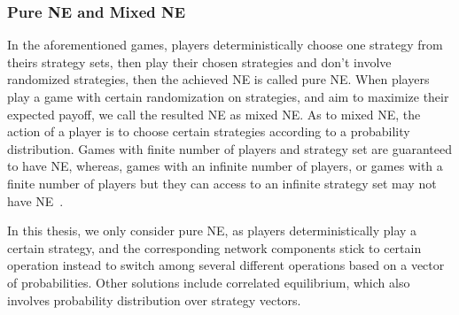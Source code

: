 




\subsubsection*{Pure NE and Mixed NE}
In the aforementioned games, players deterministically choose one strategy from theirs strategy sets, then play their chosen strategies and don't involve randomized strategies, then the achieved NE is called pure NE. 
When players play a game with certain randomization on strategies, and aim to maximize their expected payoff, we call the resulted NE as mixed NE.
As to mixed NE, the action of a player is to choose certain strategies according to a probability distribution.
Games with finite number of players and strategy set are guaranteed to have NE, whereas, games with an infinite number of players, or games with a finite number of players but they can access to an infinite strategy set may not have NE~\cite{agt_book}.

In this thesis, we only consider pure NE, as players deterministically play a certain strategy, and the corresponding network components stick to certain operation instead to switch among several different operations based on a vector of probabilities.
Other solutions include correlated equilibrium, which also involves probability distribution over strategy vectors.



